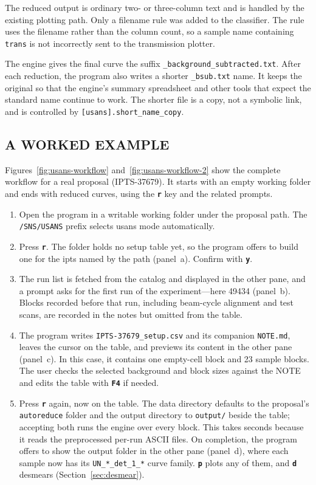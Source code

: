 \documentclass[tm]{ornltm}
\newcommand{\key}[1]{\textbf{\texttt{#1}}}
\begin{document}
The reduced output is ordinary two- or three-column text and is handled by the
existing plotting path. Only a filename rule was added to the classifier. The
rule uses the filename rather than the column count, so a sample name containing
\texttt{trans} is not incorrectly sent to the transmission plotter.

The engine gives the final curve the suffix
\texttt{\_background\_subtracted.txt}. After each reduction, the program also
writes a shorter \texttt{\_bsub.txt} name. It keeps the original so that the
engine's summary spreadsheet and other tools that expect the standard name
continue to work. The shorter file is a copy, not a symbolic link, and is
controlled by \texttt{[usans].short\_name\_copy}.

\subsection{A WORKED EXAMPLE}
\label{sec:usans-example}

Figures~\ref{fig:usans-workflow} and~\ref{fig:usans-workflow-2} show the complete
workflow for a real proposal (IPTS-37679). It starts with an empty working folder
and ends with reduced curves, using the \key{r} key and the related prompts.

\begin{enumerate}
  \item Open the program in a writable working folder under the proposal path.
    The \texttt{/SNS/USANS} prefix selects \ac{usans} mode automatically.
  \item Press \key{r}. The folder holds no setup table yet, so the program
    offers to build one for the \ac{ipts} named by the path
    (panel~a). Confirm with \key{y}.
  \item The run list is fetched from the catalog and displayed in the other
    pane, and a prompt asks for the first run of the experiment---here
    49434 (panel~b). Blocks recorded before that run, including beam-cycle
    alignment and test scans, are recorded in the notes but omitted from the
    table.
  \item The program writes \texttt{IPTS-37679\_setup.csv} and its companion
    \texttt{NOTE.md}, leaves the cursor on the table, and previews its content
    in the other pane (panel~c). In this case, it contains one empty-cell block and
    23 sample blocks. The user checks the selected background and block sizes
    against the NOTE and edits the table with \key{F4} if needed.
  \item Press \key{r} again, now on the table. The data directory defaults to
    the proposal's \texttt{autoreduce} folder and the output directory to
    \texttt{output/} beside the table; accepting both runs the engine over
    every block. This takes seconds because it reads the preprocessed per-run
    ASCII files. On completion, the program offers to show the output folder in
    the other pane (panel~d), where each sample now has its
    \texttt{UN\_*\_det\_1\_*} curve family. \key{p} plots any of them, and
    \key{d} desmears (Section~\ref{sec:desmear}).
\end{enumerate}
\end{document}
